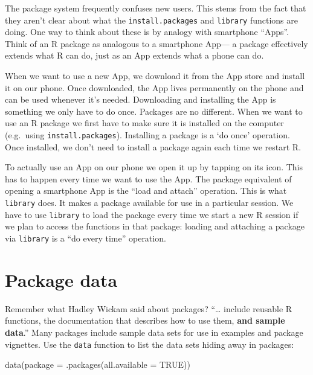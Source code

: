 \documentclass[
]{book}
\newenvironment{Shaded}{\begin{snugshade}}{\end{snugshade}}
\newcommand{\AttributeTok}[1]{\textcolor[rgb]{0.77,0.63,0.00}{#1}}
\newcommand{\ConstantTok}[1]{\textcolor[rgb]{0.00,0.00,0.00}{#1}}
\newcommand{\FunctionTok}[1]{\textcolor[rgb]{0.00,0.00,0.00}{#1}}
\newcommand{\NormalTok}[1]{#1}
\begin{document}
The package system frequently confuses new users. This stems from the fact that they aren't clear about what the \texttt{install.packages} and \texttt{library} functions are doing. One way to think about these is by analogy with smartphone ``Apps''. Think of an R package as analogous to a smartphone App--- a package effectively extends what R can do, just as an App extends what a phone can do.

When we want to use a new App, we download it from the App store and install it on our phone. Once downloaded, the App lives permanently on the phone and can be used whenever it's needed. Downloading and installing the App is something we only have to do once. Packages are no different. When we want to use an R package we first have to make sure it is installed on the computer (e.g.~using \texttt{install.packages}). Installing a package is a `do once' operation. Once installed, we don't need to install a package again each time we restart R.

To actually use an App on our phone we open it up by tapping on its icon. This has to happen every time we want to use the App. The package equivalent of opening a smartphone App is the ``load and attach'' operation. This is what \texttt{library} does. It makes a package available for use in a particular session. We have to use \texttt{library} to load the package every time we start a new R session if we plan to access the functions in that package: loading and attaching a package via \texttt{library} is a ``do every time'' operation.

\hypertarget{package-data}{%
\section{Package data}\label{package-data}}

Remember what Hadley Wickam said about packages? ``\ldots{} include reusable R functions, the documentation that describes how to use them, \textbf{and sample data}.'' Many packages include sample data sets for use in examples and package vignettes. Use the \texttt{data} function to list the data sets hiding away in packages:

\begin{Shaded}
\begin{Highlighting}[]
\FunctionTok{data}\NormalTok{(}\AttributeTok{package =} \FunctionTok{.packages}\NormalTok{(}\AttributeTok{all.available =} \ConstantTok{TRUE}\NormalTok{))}
\end{Highlighting}
\end{Shaded}
\end{document}
